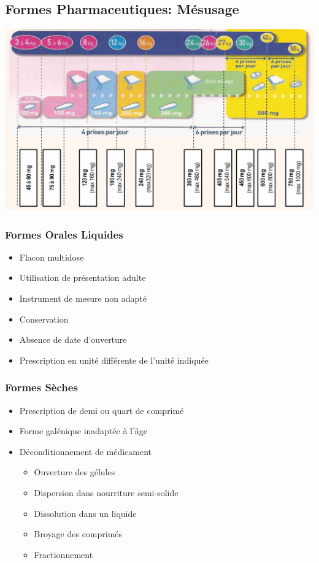 \documentclass[11pt]{article}
\begin{document}
\subsection{Formes Pharmaceutiques: Mésusage}
\label{sec:orgee4a136}
\begin{center}
\includegraphics[width=.9\linewidth]{./pedia_galenique.png}
\end{center}
\subsubsection{Formes Orales Liquides}
\label{sec:org3ceb708}
\begin{itemize}
\item Flacon multidose
\item Utilisation de présentation adulte
\item Instrument de mesure non adapté
\item Conservation
\item Absence de date d'ouverture
\item Prescription en unité différente de l'unité indiquée
\end{itemize}
\subsubsection{Formes Sèches}
\label{sec:org30ee3e5}
\begin{itemize}
\item Prescription de demi ou quart de comprimé
\item Forme galénique inadaptée à l'âge
\item Déconditionnement de médicament
\begin{itemize}
\item Ouverture des gélules
\item Dispersion dans nourriture semi-solide
\item Dissolution dans un liquide
\item Broyage des comprimés
\item Fractionnement
\end{itemize}
\end{itemize}
\end{document}
